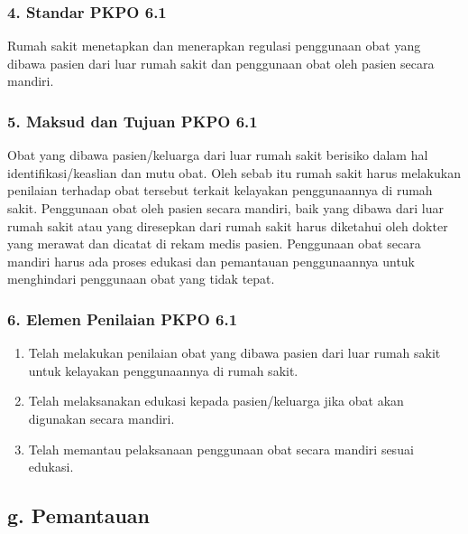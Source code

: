 \documentclass[
]{book}
\providecommand{\tightlist}{%
  \setlength{\itemsep}{0pt}\setlength{\parskip}{0pt}}
\begin{document}
\hypertarget{standar-pkpo-6.1}{%
\subsubsection*{4. Standar PKPO 6.1}\label{standar-pkpo-6.1}}

Rumah sakit menetapkan dan menerapkan regulasi penggunaan obat yang dibawa pasien dari luar rumah sakit dan penggunaan obat oleh pasien secara mandiri.

\hypertarget{maksud-dan-tujuan-pkpo-6.1}{%
\subsubsection*{5. Maksud dan Tujuan PKPO 6.1}\label{maksud-dan-tujuan-pkpo-6.1}}

Obat yang dibawa pasien/keluarga dari luar rumah sakit berisiko dalam hal identifikasi/keaslian dan mutu obat. Oleh sebab itu rumah sakit harus melakukan penilaian terhadap obat tersebut terkait kelayakan penggunaannya di rumah sakit. Penggunaan obat oleh pasien secara mandiri, baik yang dibawa dari luar rumah sakit atau yang diresepkan dari rumah sakit harus diketahui oleh dokter yang merawat dan dicatat di rekam medis pasien. Penggunaan obat secara mandiri harus ada proses edukasi dan pemantauan penggunaannya untuk menghindari penggunaan obat yang tidak tepat.

\hypertarget{elemen-penilaian-pkpo-6.1}{%
\subsubsection*{6. Elemen Penilaian PKPO 6.1}\label{elemen-penilaian-pkpo-6.1}}

\begin{enumerate}
\def\labelenumi{\alph{enumi}.}
\tightlist
\item
  Telah melakukan penilaian obat yang dibawa pasien dari luar rumah sakit untuk kelayakan penggunaannya di rumah sakit.
\item
  Telah melaksanakan edukasi kepada pasien/keluarga jika obat akan digunakan secara mandiri.
\item
  Telah memantau pelaksanaan penggunaan obat secara mandiri sesuai edukasi.
\end{enumerate}

\hypertarget{g.-pemantauan}{%
\subsection*{g. Pemantauan}\label{g.-pemantauan}}
\end{document}
